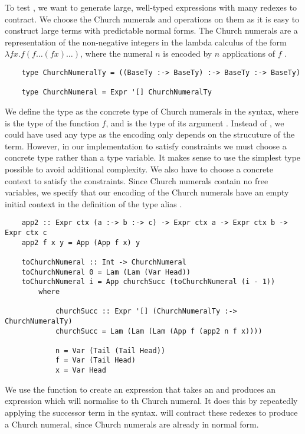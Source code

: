 To test , we want to generate large, well-typed expressions with many redexes to contract. We choose the Church numerals and operations on them as it is easy to construct large terms with predictable normal forms. The Church numerals are a representation of the non-negative integers in the lambda calculus of the form $\lambda f x . f (f \dots (f x) \dots)$, where the numeral $n$ is encoded by $n$ applications of $f$ \cite{churchEncodings}.  

\begin{lstlisting}
    type ChurchNumeralTy = ((BaseTy :-> BaseTy) :-> BaseTy :-> BaseTy)

    type ChurchNumeral = Expr '[] ChurchNumeralTy
\end{lstlisting}

We define the type  as the concrete type of Church numerals in the  syntax, where  is the type of the function $f$, and  is the type of its argument . Instead of , we could have used any type as the encoding only depends on the strucuture of the term. However, in our implementation to satisfy  constraints we must choose a concrete type rather than a type variable. It makes sense to use the simplest type possible to avoid additional complexity. We also have to choose a concrete context to satisfy the  constraints. Since Church numerals contain no free variables, we specify that our encoding of the Church numerals have an empty initial context in the definition of the type alias . 

\begin{lstlisting}
    app2 :: Expr ctx (a :-> b :-> c) -> Expr ctx a -> Expr ctx b -> Expr ctx c
    app2 f x y = App (App f x) y 

    toChurchNumeral :: Int -> ChurchNumeral
    toChurchNumeral 0 = Lam (Lam (Var Head))
    toChurchNumeral i = App churchSucc (toChurchNumeral (i - 1)) 
        where

            churchSucc :: Expr '[] (ChurchNumeralTy :-> ChurchNumeralTy)
            churchSucc = Lam (Lam (Lam (App f (app2 n f x))))

            n = Var (Tail (Tail Head))
            f = Var (Tail Head)
            x = Var Head
\end{lstlisting}

We use the  function to create an expression that takes an   and produces an expression which will normalise to th Church numeral. It does this by repeatedly applying the successor term  in the syntax.  will contract these redexes to produce a Church numeral, since Church numerals are already in normal form. 

